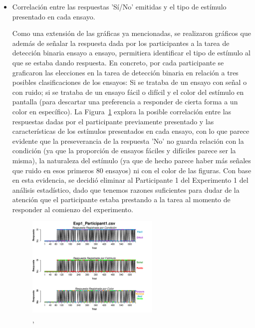 \begin{itemize}
\item Correlación entre las respuestas 'Sí/No' emitidas y el tipo de estímulo presentado en cada ensayo.

Como una extensión de las gráficas ya mencionadas, se realizaron gráficos que además de señalar la respuesta dada por los participantes a la tarea de detección binaria ensayo a ensayo, permitiera identificar el tipo de estímulo al que se estaba dando respuesta. En concreto, por cada participante se graficaron las elecciones en la tarea de detección binaria en relación a tres posibles clasificaciones de los ensayos: Si se trataba de un ensayo con señal o con ruido; si se trataba de un ensayo fácil o difícil y el color del estímulo en pantalla (para descartar una preferencia a responder de cierta forma a un color en específico). La Figura~\ref{fig:BiasResp_E1_P1} explora la posible correlación entre las respuestas dadas por el participante previamente presentado y las características de los estímulos presentados en cada ensayo, con lo que parece evidente que la preseverancia de la respuesta 'No' no guarda relación con la condición (ya que la proporción de ensayos fáciles y difíciles parece ser la misma), la naturaleza del estímulo (ya que de hecho parece haber más señales que ruido en esos primeros 80 ensayos) ni con el color de las figuras. Con base en esta evidencia, se decidió eliminar al Participante 1 del Experimento 1 del análisis estadístico, dado que tenemos razones suficientes para dudar de la atención que el participante estaba prestando a la tarea al momento de responder al comienzo del experimento.\\


\begin{figure}[th]
\centering
\includegraphics[width=0.60\textwidth]{Figures/BiasResp_Exp1_P1} 
\caption[ParticipanteSesgado_Variables]{,}
\label{fig:BiasResp_E1_P1}
\end{figure}


\end{itemize}
